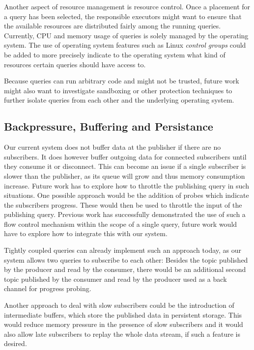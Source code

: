 Another aspect of resource management is resource control. Once a placement
for a query has been selected, the responsible executors might want to ensure
that the available resources are distributed fairly among the
running queries. Currently, CPU and memory usage of queries is solely managed
by the operating system. The use of operating system features such as
Linux \emph{control groups} \cite{cgroups} could be added to more precisely indicate
to the operating system what kind of resources certain queries should have
access to.

Because queries can run arbitrary code and might not be trusted,
future work might also want to investigate sandboxing or other protection
techniques to further isolate queries from each other and the underlying operating
system.

\subsection{Backpressure, Buffering and Persistance}

Our current system does not buffer data at the publisher if there are no
subscribers. It does however buffer outgoing data for connected subscribers
until they consume it or disconnect. This can become an issue if a single
subscriber is slower than the publisher, as its queue will grow and thus
memory consumption increase. Future work has to explore how to throttle
the publishing query in such situations. One possible approach would be the
addition of probes which indicate the subscribers progress. These would then
be used to throttle the input of the publishing query. Previous work \cite{faucet} has
successfully demonstrated the use of such a flow control mechanism within the
scope of a single query, future work would have to explore how to integrate
this with our system.

Tightly coupled queries can already implement such an approach today, as our
system allows two queries to subscribe to each other: Besides the topic published by the producer and
read by the consumer, there would be an additional second topic published by the
consumer and read by the producer used as a back channel for progress probing.

Another approach to deal with slow subscribers could be the introduction of
intermediate buffers, which store the published data in persistent storage. 
This would reduce memory pressure in the presence of slow subscribers and it
would also allow late subscribers to replay the whole data stream, if such
a feature is desired.

